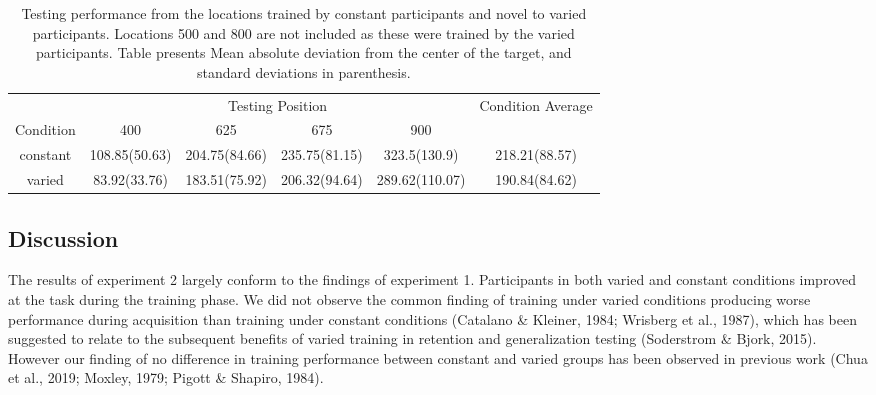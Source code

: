 \documentclass[
  man,floatsintext]{apa7}
\begin{document}
\begin{table}

\caption{\label{tab:e2tab3}Testing performance from the locations trained by constant participants and novel to varied participants. Locations 500 and 800 are not included as these were trained by the varied participants. Table presents Mean absolute deviation from the center of the target, and standard deviations in parenthesis.}
\centering
\begin{tabular}[t]{c|c|c|c|c|c}
\hline
\multicolumn{1}{c|}{} & \multicolumn{4}{c|}{Testing Position} & \multicolumn{1}{c}{Condition Average} \\
\cline{2-5} \cline{6-6}
Condition & 400 & 625 & 675 & 900 & \\
\hline
constant & 108.85(50.63) & 204.75(84.66) & 235.75(81.15) & 323.5(130.9) & 218.21(88.57)\\
\hline
varied & 83.92(33.76) & 183.51(75.92) & 206.32(94.64) & 289.62(110.07) & 190.84(84.62)\\
\hline
\end{tabular}
\end{table}

\hypertarget{discussion-1}{%
\subsection{Discussion}\label{discussion-1}}

The results of experiment 2 largely conform to the findings of experiment 1. Participants in both varied and constant conditions improved at the task during the training phase. We did not observe the common finding of training under varied conditions producing worse performance during acquisition than training under constant conditions (Catalano \& Kleiner, 1984; Wrisberg et al., 1987), which has been suggested to relate to the subsequent benefits of varied training in retention and generalization testing (Soderstrom \& Bjork, 2015). However our finding of no difference in training performance between constant and varied groups has been observed in previous work (Chua et al., 2019; Moxley, 1979; Pigott \& Shapiro, 1984).
\end{document}
